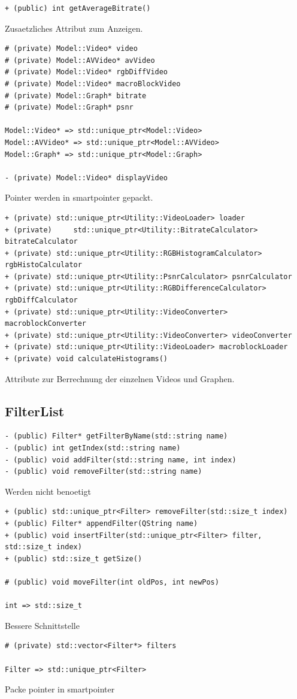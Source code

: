 \documentclass[parskip=full]{scrartcl}
\begin{document}
\begin{verbatim}
+ (public) int getAverageBitrate()
\end{verbatim}
Zusaetzliches Attribut zum Anzeigen.
\begin{verbatim}
# (private) Model::Video* video
# (private) Model::AVVideo* avVideo
# (private) Model::Video* rgbDiffVideo
# (private) Model::Video* macroBlockVideo
# (private) Model::Graph* bitrate
# (private) Model::Graph* psnr

Model::Video* => std::unique_ptr<Model::Video>
Model::AVVideo* => std::unique_ptr<Model::AVVideo>
Model::Graph* => std::unique_ptr<Model::Graph>

- (private) Model::Video* displayVideo
\end{verbatim}
Pointer werden in smartpointer gepackt.
\begin{verbatim}
+ (private) std::unique_ptr<Utility::VideoLoader> loader
+ (private) 	std::unique_ptr<Utility::BitrateCalculator> bitrateCalculator
+ (private) std::unique_ptr<Utility::RGBHistogramCalculator> rgbHistoCalculator
+ (private) std::unique_ptr<Utility::PsnrCalculator> psnrCalculator
+ (private) std::unique_ptr<Utility::RGBDifferenceCalculator> rgbDiffCalculator
+ (private) std::unique_ptr<Utility::VideoConverter> macroblockConverter
+ (private) std::unique_ptr<Utility::VideoConverter> videoConverter
+ (private) std::unique_ptr<Utility::VideoLoader> macroblockLoader
+ (private) void calculateHistograms()
\end{verbatim}
Attribute zur Berrechnung der einzelnen Videos und Graphen.
\subsection{FilterList}
\begin{verbatim}
- (public) Filter* getFilterByName(std::string name)
- (public) int getIndex(std::string name)
- (public) void addFilter(std::string name, int index)
- (public) void removeFilter(std::string name)
\end{verbatim}
Werden nicht benoetigt
\begin{verbatim}
+ (public) std::unique_ptr<Filter> removeFilter(std::size_t index)
+ (public) Filter* appendFilter(QString name)
+ (public) void insertFilter(std::unique_ptr<Filter> filter, std::size_t index)
+ (public) std::size_t getSize()

# (public) void moveFilter(int oldPos, int newPos)

int => std::size_t
\end{verbatim}
Bessere Schnittstelle
\begin{verbatim}
# (private) std::vector<Filter*> filters

Filter => std::unique_ptr<Filter>
\end{verbatim}
Packe pointer in smartpointer
\end{document}
